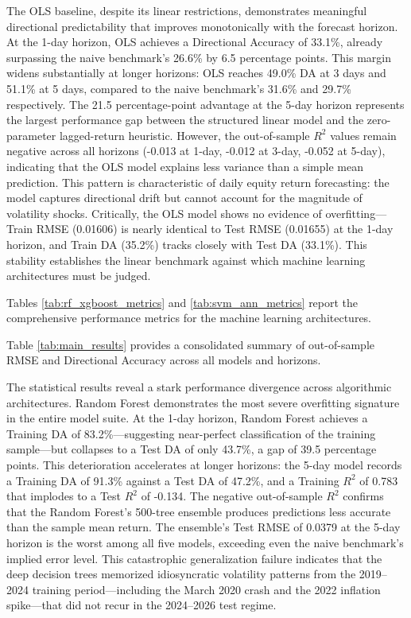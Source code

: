\documentclass[12pt]{article}
\begin{document}
The OLS baseline, despite its linear restrictions, demonstrates meaningful directional predictability that improves monotonically with the forecast horizon. At the 1-day horizon, OLS achieves a Directional Accuracy of 33.1\%, already surpassing the naive benchmark's 26.6\% by 6.5 percentage points. This margin widens substantially at longer horizons: OLS reaches 49.0\% DA at 3 days and 51.1\% at 5 days, compared to the naive benchmark's 31.6\% and 29.7\% respectively. The 21.5 percentage-point advantage at the 5-day horizon represents the largest performance gap between the structured linear model and the zero-parameter lagged-return heuristic. However, the out-of-sample $R^2$ values remain negative across all horizons (-0.013 at 1-day, -0.012 at 3-day, -0.052 at 5-day), indicating that the OLS model explains less variance than a simple mean prediction. This pattern is characteristic of daily equity return forecasting: the model captures directional drift but cannot account for the magnitude of volatility shocks. Critically, the OLS model shows no evidence of overfitting---Train RMSE (0.01606) is nearly identical to Test RMSE (0.01655) at the 1-day horizon, and Train DA (35.2\%) tracks closely with Test DA (33.1\%). This stability establishes the linear benchmark against which machine learning architectures must be judged.

Tables \ref{tab:rf_xgboost_metrics} and \ref{tab:svm_ann_metrics} report the comprehensive performance metrics for the machine learning architectures.




Table \ref{tab:main_results} provides a consolidated summary of out-of-sample RMSE and Directional Accuracy across all models and horizons.



The statistical results reveal a stark performance divergence across algorithmic architectures. Random Forest demonstrates the most severe overfitting signature in the entire model suite. At the 1-day horizon, Random Forest achieves a Training DA of 83.2\%---suggesting near-perfect classification of the training sample---but collapses to a Test DA of only 43.7\%, a gap of 39.5 percentage points. This deterioration accelerates at longer horizons: the 5-day model records a Training DA of 91.3\% against a Test DA of 47.2\%, and a Training $R^2$ of 0.783 that implodes to a Test $R^2$ of -0.134. The negative out-of-sample $R^2$ confirms that the Random Forest's 500-tree ensemble produces predictions less accurate than the sample mean return. The ensemble's Test RMSE of 0.0379 at the 5-day horizon is the worst among all five models, exceeding even the naive benchmark's implied error level. This catastrophic generalization failure indicates that the deep decision trees memorized idiosyncratic volatility patterns from the 2019--2024 training period---including the March 2020 crash and the 2022 inflation spike---that did not recur in the 2024--2026 test regime.
\end{document}
